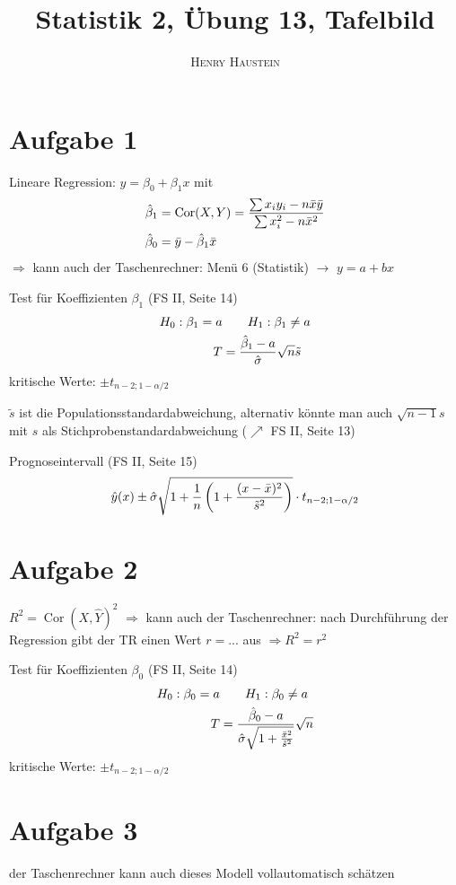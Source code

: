 \documentclass{article}
\title{\textbf{Statistik 2, Übung 13, Tafelbild}}
\author{\textsc{Henry Haustein}}
\date{}
\DeclareMathOperator{\Cor}{Cor}
\begin{document}
	\maketitle
	
	\section*{Aufgabe 1}
	Lineare Regression: $y = \beta_0 + \beta_1x$ mit
	\begin{align}
		\hat{\beta}_1 &= \Cor(X,Y) = \frac{\sum x_iy_i - n\bar{x}\bar{y}}{\sum x_i^2 - n\bar{x}^2} \notag \\
		\hat{\beta}_0 &= \bar{y} - \hat{\beta}_1\bar{x} \notag
	\end{align}
	$\Rightarrow$ kann auch der Taschenrechner: Menü 6 (Statistik) $\to$ $y = a+bx$

	Test für Koeffizienten $\beta_1$ (FS II, Seite 14)
	\begin{align}
		H_0: \beta_1 = a &\qquad H_1: \beta_1 \neq a \notag \\
		T &= \frac{\hat{\beta}_1 - a}{\hat{\sigma}}\sqrt{n}\tilde{s} \notag
	\end{align}
	kritische Werte: $\pm t_{n-2;1-\alpha/2}$
	
	$\tilde{s}$ ist die Populationsstandardabweichung, alternativ könnte man auch $\sqrt{n-1}s$ mit $s$ als Stichprobenstandardabweichung ($\nearrow$ FS II, Seite 13)
	
	Prognoseintervall (FS II, Seite 15)
	\begin{align}
		\hat{y}(x) \pm \hat{\sigma}\sqrt{1+\frac{1}{n}\left(1+\frac{(x-\bar{x})^2}{\tilde{s}^2}\right)}\cdot t_{n-2;1-\alpha/2} \notag
	\end{align}
	
	\section*{Aufgabe 2}
	$R^2 = \Cor(X, \hat{Y})^2$ $\Rightarrow$ kann auch der Taschenrechner: nach Durchführung der Regression gibt der TR einen Wert $r = ...$ aus $\Rightarrow R^2 = r^2$
	
	Test für Koeffizienten $\beta_0$ (FS II, Seite 14)
	\begin{align}
		H_0: \beta_0 = a &\qquad H_1: \beta_0 \neq a \notag \\
		T &= \frac{\hat{\beta}_0 - a}{\hat{\sigma}\sqrt{1+\frac{\bar{x}^2}{\tilde{s}^2}}}\sqrt{n} \notag
	\end{align}
	kritische Werte: $\pm t_{n-2;1-\alpha/2}$
	
	\section*{Aufgabe 3}
	der Taschenrechner kann auch dieses Modell vollautomatisch schätzen
	
\end{document}
